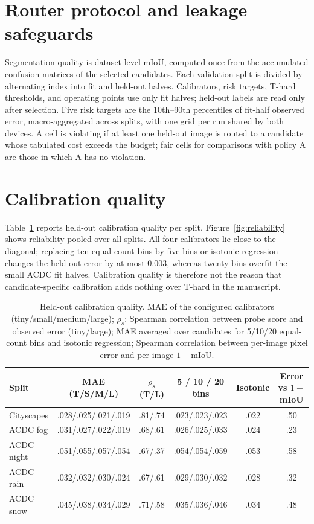 \documentclass[a4paper,review,12pt]{elsarticle}
\newcommand{\miou}{mIoU}
\begin{document}
\section{Router protocol and leakage safeguards}

Segmentation quality is dataset-level \miou{}, computed once from the accumulated confusion matrices of the selected candidates. Each validation split is divided by alternating index into fit and held-out halves. Calibrators, risk targets, T-hard thresholds, and operating points use only fit halves; held-out labels are read only after selection. Five risk targets are the 10th--90th percentiles of fit-half observed error, macro-aggregated across splits, with one grid per run shared by both devices. A cell is violating if at least one held-out image is routed to a candidate whose tabulated cost exceeds the budget; fair cells for comparisons with policy A are those in which A has no violation.

\section{Calibration quality}

Table~\ref{tab:calibration} reports held-out calibration quality per split. Figure~\ref{fig:reliability} shows reliability pooled over all splits. All four calibrators lie close to the diagonal; replacing ten equal-count bins by five bins or isotonic regression changes the held-out error by at most 0.003, whereas twenty bins overfit the small ACDC fit halves. Calibration quality is therefore not the reason that candidate-specific calibration adds nothing over T-hard in the manuscript.

\begin{table}[H]
\centering
\caption{Held-out calibration quality. MAE of the configured calibrators (tiny/small/medium/large); $\rho_s$: Spearman correlation between probe score and observed error (tiny/large); MAE averaged over candidates for 5/10/20 equal-count bins and isotonic regression; Spearman correlation between per-image pixel error and per-image $1-$\miou{}.}
\label{tab:calibration}
\scriptsize
\setlength{\tabcolsep}{3pt}
\begin{tabular}{@{}lccccc@{}}
\toprule
Split & MAE (T/S/M/L) & $\rho_s$ (T/L) & 5 / 10 / 20 bins & Isotonic & Error vs $1-$\miou{} \\
\midrule
Cityscapes & .028/.025/.021/.019 & .81/.74 & .023/.023/.023 & .022 & .50 \\
ACDC fog & .031/.027/.022/.019 & .68/.61 & .026/.025/.033 & .024 & .23 \\
ACDC night & .051/.055/.057/.054 & .67/.37 & .054/.054/.059 & .053 & .58 \\
ACDC rain & .032/.032/.030/.024 & .67/.61 & .029/.030/.032 & .028 & .32 \\
ACDC snow & .045/.038/.034/.029 & .71/.58 & .035/.036/.046 & .034 & .48 \\
\bottomrule
\end{tabular}
\end{table}
\end{document}
